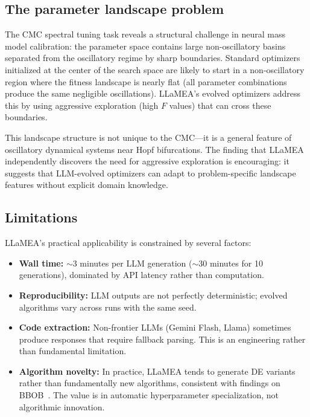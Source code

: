 \documentclass[11pt,a4paper]{article}
\begin{document}
\subsection{The parameter landscape problem}

The CMC spectral tuning task reveals a structural challenge in neural mass model calibration: the parameter space contains large non-oscillatory basins separated from the oscillatory regime by sharp boundaries.
Standard optimizers initialized at the center of the search space are likely to start in a non-oscillatory region where the fitness landscape is nearly flat (all parameter combinations produce the same negligible oscillations).
LLaMEA's evolved optimizers address this by using aggressive exploration (high $F$ values) that can cross these boundaries.

This landscape structure is not unique to the CMC—it is a general feature of oscillatory dynamical systems near Hopf bifurcations.
The finding that LLaMEA independently discovers the need for aggressive exploration is encouraging: it suggests that LLM-evolved optimizers can adapt to problem-specific landscape features without explicit domain knowledge.

\subsection{Limitations}

LLaMEA's practical applicability is constrained by several factors:
\begin{itemize}
    \item \textbf{Wall time:} $\sim$3 minutes per LLM generation ($\sim$30 minutes for 10 generations), dominated by API latency rather than computation.
    \item \textbf{Reproducibility:} LLM outputs are not perfectly deterministic; evolved algorithms vary across runs with the same seed.
    \item \textbf{Code extraction:} Non-frontier LLMs (Gemini Flash, Llama) sometimes produce responses that require fallback parsing. This is an engineering rather than fundamental limitation.
    \item \textbf{Algorithm novelty:} In practice, LLaMEA tends to generate DE variants rather than fundamentally new algorithms, consistent with findings on BBOB~\citep{vanStein2025}. The value is in automatic hyperparameter specialization, not algorithmic innovation.
\end{itemize}
\end{document}
